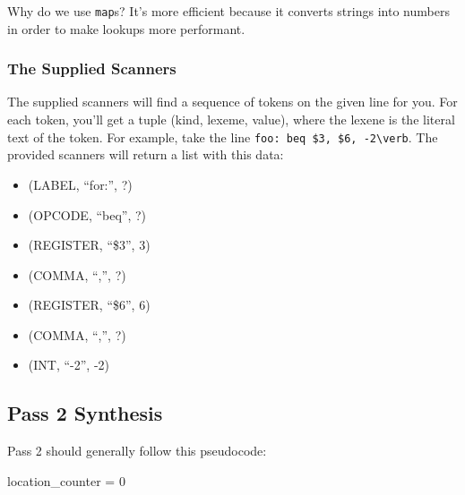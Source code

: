 \documentclass[]{article}
\theoremstyle{definition}
\begin{document}
					Why do we use \verb+map+s? It's more efficient because it converts strings into numbers in order to make lookups more performant.

			\subsubsection{The Supplied Scanners}
			The supplied scanners will find a sequence of tokens on the given line for you. For each token, you'll get a tuple (kind, lexeme, value), where the lexene is the literal text of the token. For example, take the line \verb+foo: beq $3, $6, -2\verb+. The provided scanners will return a list with this data:
			\begin{itemize}
				\item (LABEL, ``for:'', ?)
				\item (OPCODE, ``beq'', ?)
				\item (REGISTER, ``\$3'', 3)
				\item (COMMA, ``,'', ?)
				\item (REGISTER, ``\$6'', 6)
				\item (COMMA, ``,'', ?)
				\item (INT, ``-2'', -2)
			\end{itemize}
		\subsection{Pass 2 \textendash{} Synthesis}
			Pass 2 should generally follow this pseudocode:
			\begin{algorithm}
				location\_counter = 0\;
			\end{algorithm}
\end{document}
